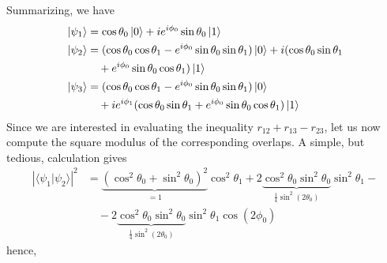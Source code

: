 \documentclass[letterpaper,onecolumn,12pt,accepted=2024-01-17]{article}
\begin{document}
Summarizing, we have
\begin{align*}
    \ket{\psi_1}&= \cos\theta_0 \ket{0} + ie^{i\phi_0}\sin\theta_0\ket{1}\\
    \ket{\psi_2}&=(\cos\theta_0\cos\theta_1-e^{i\phi_0}\sin\theta_0\sin\theta_1)\ket{0}+i(\cos\theta_0\sin\theta_1\\
    & \quad +e^{i\phi_0}\sin\theta_0\cos\theta_1)\ket{1}\\
    \ket{\psi_3}&=(\cos\theta_0\cos\theta_1-e^{i\phi_0}\sin\theta_0\sin\theta_1)\ket{0}\\
    &\quad +ie^{i\phi_1}(\cos\theta_0\sin\theta_1+e^{i\phi_0}\sin\theta_0\cos\theta_1)\ket{1}
\end{align*}
Since we are interested in evaluating the inequality $r_{12}+r_{13}-r_{23}$, let us now compute the square modulus of the corresponding overlaps. A simple, but tedious, calculation gives
\begin{align*}
    |\langle \psi_1\vert \psi_2 \rangle|^2 & = \underbrace{(\cos^2\theta_0 + \sin^2\theta_0)^2}_{=1} \cos^2\theta_1 + 2 \underbrace{\cos^2\theta_0 \sin^2\theta_0}_{\frac{1}{4}\sin^2(2\theta_0)} \sin^2\theta_1 - \\
    &\quad - 2 \underbrace{\cos^2\theta_0 \sin^2\theta_0}_{\frac{1}{4}\sin^2(2\theta_0)} \sin^2\theta_1 \cos(2\phi_0)
\end{align*}
hence,
\end{document}
